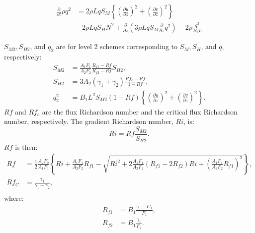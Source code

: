 \begin{align}
  \frac{\partial }{\partial t}\rho q^2
  &= 2\rho LqS_M\left\{\left(\frac{\partial u}{\partial z}\right)^2
                +\left(\frac{\partial v}{\partial z}\right)^2\right\} \nonumber\\
  &-2\rho LqS_HN^2
  +\frac{\partial}{\partial z}\left(3\rho LqS_M\frac{\partial}{\partial z}q^2\right)
  -2\rho\frac{q^3}{B_1L}
\end{align}

$S_{M2}, S_{H2}$, and $q_2$ are for level 2 schemes corresponding to $S_M, S_H$, and $q$, respectively:
\begin{align}
  S_{M2} &= \frac{A_1F_1}{A_2F_2}\frac{R_{f1}-Rf}{R_{f2}-Rf} S_{H2}, \\
  S_{H2} &= 3 A_2 (\gamma_1 + \gamma_2) \frac{Rf_c - Rf}{1-Rf}, \\
  q_2^2 &= B_1 L^2 S_{M2} (1-Rf) \left\{\left(\frac{\partial u}{\partial z}\right)^2+\left(\frac{\partial v}{\partial z}\right)^2\right\}.
\end{align}
$Rf$ and $Rf_c$ are the flux Richardson number and the critical flux Richardson number, respectively.
The gradient Richardson number, $Ri$, is:
\begin{equation}
  Ri = Rf \frac{S_{M2}}{S_{H2}}.
\end{equation}
$Rf$ is then:
\begin{align}
  Rf &= \frac{1}{2}\frac{A_2F_2}{A_1F_1}
  \left\{ Ri + \frac{A_1F_1}{A_2F_2}R_{f1}
        -\sqrt{Ri^2+2\frac{A_1F_1}{A_2F_2}(R_{f1}-2R_{f2})Ri+\left(\frac{A_1F_1}{A_2F_2}R_{f1}\right)^2} \right\}, \\
  Rf_C &= \frac{\gamma_1}{\gamma_1+\gamma_2}, \\
\end{align}
where:
\begin{align}
  R_{f1} &= B_1\frac{\gamma_1-C_1}{F_1}, \\
  R_{f2} &= B_1\frac{\gamma_1}{F_2}.
\end{align}

